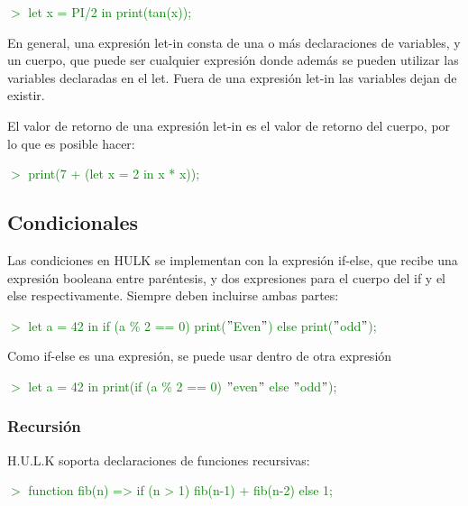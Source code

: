 \documentclass[a4paper,12pt]{article}
\begin{document}
    \textcolor{green}{$>$ let x = PI/2 in print(tan(x));}

    \begin{flushleft}
        En general, una expresión let-in consta de una o más declaraciones de variables, y un cuerpo, que puede ser cualquier expresión donde además se pueden utilizar las variables declaradas en el let. Fuera de una expresión let-in las variables dejan de existir.
    \end{flushleft}

    \begin{flushleft}
        El valor de retorno de una expresión let-in es el valor de retorno del cuerpo, por lo que es posible hacer:
    \end{flushleft}
    
    \textcolor{green}{$>$ print(7 + (let x = 2 in x * x));}
    
    \subsection{Condicionales}\label{sub:conditionals}
        \begin{flushleft}
            Las condiciones en HULK se implementan con la expresión if-else, que recibe una expresión booleana entre paréntesis, y dos expresiones para el cuerpo del if y el else respectivamente. Siempre deben incluirse ambas partes:
        \end{flushleft}
        
        \textcolor{green}{$>$ let a = 42 in if (a \% 2 == 0) print($"$Even$"$) else print($"$odd$"$);}
        
        \begin{flushleft}
            Como if-else es una expresión, se puede usar dentro de otra expresión
        \end{flushleft}

        \textcolor{green}{$>$ let a = 42 in print(if (a \% 2 == 0) $"$even$"$ else $"$odd$"$);}

    \subsubsection{Recursión}\label{sub:recursive}
    \begin{flushleft}
        H.U.L.K soporta declaraciones de funciones recursivas:
    \end{flushleft}

    \textcolor{green}{$>$ function fib(n) => if (n > 1) fib(n-1) + fib(n-2) else 1;}
\end{document}
